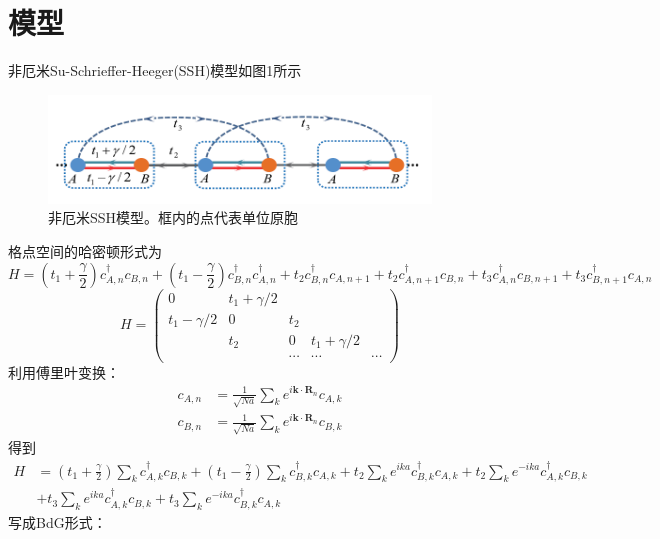 \documentclass{article}
\newcommand{\mk}{\mathbf{k}}
\newcommand{\mR}{\mathbf{R}}
\begin{document}
\section{模型}
非厄米Su-Schrieffer-Heeger(SSH)模型如图1所示
\begin{figure}[h]
    \centering
    \includegraphics[width=4in]{fig1.png}
    \caption{非厄米SSH模型。框内的点代表单位原胞}
\end{figure}
格点空间的哈密顿形式为
\begin{equation}
    H=(t_1+\frac{\gamma}{2})c_{A,n}^\dagger c_{B,n}+(t_1-\frac{\gamma}{2})c_{B,n}^\dagger c_{A,n}^\dagger+t_2c_{B,n}^\dagger c_{A,n+1}+t_2c_{A,n+1}^\dagger c_{B,n}+t_3 c_{A,n}^\dagger c_{B,n+1}+t_3c_{B,n+1}^\dagger c_{A,n}
\end{equation}
\begin{equation}
    H=\begin{pmatrix}
        0&t_1+\gamma/2\\
        t_1-\gamma/2&0&t_2\\
        &t_2&0&t_1+\gamma/2\\
        &&\cdots&\cdots&\cdots
    \end{pmatrix}
\end{equation}
利用傅里叶变换：
\begin{equation*}
    \begin{split}
        c_{A,n}&=\frac{1}{\sqrt{Na}}\sum_{k}e^{i\mk\cdot\mR_n}c_{A,k}\\
        c_{B,n}&=\frac{1}{\sqrt{Na}}\sum_{k}e^{i\mk\cdot\mR_n}c_{B,k}
    \end{split}
\end{equation*}
得到
\begin{equation}
    \begin{split}
        H&=(t_1+\frac{\gamma}{2})\sum_{k}c_{A,k}^\dagger c_{B,k}+(t_1-\frac{\gamma}{2})\sum_{k}c_{B,k}^\dagger c_{A,k}+t_2\sum_{k}e^{ika}c_{B,k}^\dagger c_{A,k}+t_2\sum_{k}e^{-ika}c_{A,k}^\dagger c_{B,k}\\
        &+t_3\sum_{k}e^{ika}c_{A,k}^\dagger c_{B,k}+t_3\sum_{k}e^{-ika}c_{B,k}^\dagger c_{A,k}
    \end{split}
\end{equation}
写成BdG形式：
\end{document}
